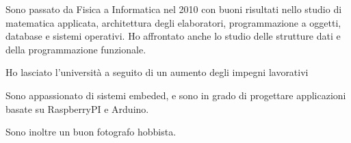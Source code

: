 \documentclass[10pt,a4paper]{altacv}
\begin{document}
\smallskip

Sono passato da Fisica a Informatica nel 2010 con buoni risultati nello studio di matematica applicata, architettura degli elaboratori, programmazione a oggetti, database e sistemi operativi. Ho affrontato anche lo studio delle strutture dati e della programmazione funzionale.

\smallskip

Ho lasciato l'università a seguito di un aumento degli impegni lavorativi

Sono appassionato di sistemi embeded, e sono in grado di progettare applicazioni basate su RaspberryPI e Arduino.

\smallskip

Sono inoltre un buon fotografo hobbista.
\end{document}
